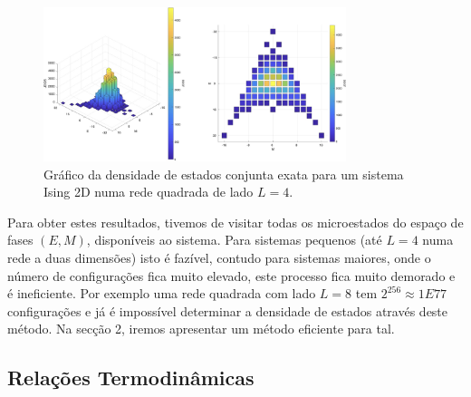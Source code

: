\documentclass[12pt, a4paper]{article}
\begin{document}
	\begin{figure}[h]
	\centering
	\includegraphics[scale=0.20, height=4.5cm]{JDOS_exact_L4_SS.jpeg}
	\caption{Gráfico da densidade de estados conjunta exata para um sistema Ising 2D numa rede quadrada de lado $L=4$. }
	\label{exact_L4}
	\end{figure}
	
	Para obter estes  resultados, tivemos de visitar todas os microestados do espaço de fases $(E, M)$, disponíveis ao sistema. Para sistemas pequenos (até $L=4$ numa rede a duas dimensões) isto é fazível, contudo para sistemas maiores, onde o número de configurações fica  muito elevado, este processo fica muito demorado e é ineficiente. Por exemplo uma rede quadrada com lado $L=8$ tem $2^{256} \approx	 1E77$ configurações e já é impossível determinar a densidade de estados através deste método. Na secção 2, iremos apresentar um método eficiente para tal.
	
		\subsection{Relações Termodinâmicas}
\end{document}
